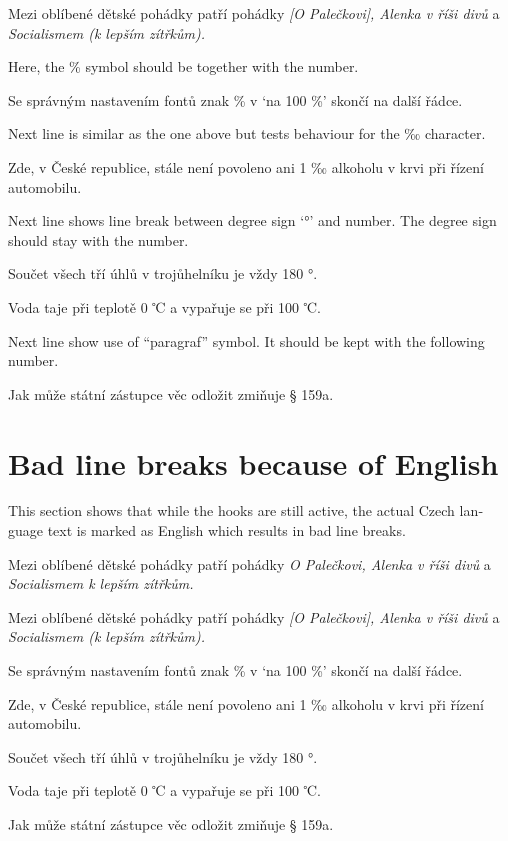 \documentclass{article}
\newcommand{\expl}[1]{\begin{english}\sffamily #1\end{english}}
\begin{document}
Mezi oblíbené dětské pohádky patří pohádky \emph{[O Palečkovi], Alenka v říši
  divů} a \emph{Socialismem (k lepším zítřkům).}

\expl{Here, the \% symbol should be together with the number.}

Se správným nastavením fontů znak \% v `na 100 \%' skončí na další řádce.

\expl{Next line is similar as the one above but tests behaviour for the ‰
  character.}

Zde, v České republice, stále není povoleno ani 1 ‰ alkoholu v krvi při
řízení automobilu.

\expl{Next line shows line break between degree sign `°' and number. The
  degree sign should stay with the number.}

Součet všech tří úhlů v trojůhelníku je vždy 180 °.

Voda taje při teplotě 0 ℃ a vypařuje se při 100 ℃.

\expl{Next line show use of ``paragraf'' symbol. It should be kept with the
  following number.}

Jak může státní zástupce věc odložit zmiňuje § 159a.


\section{Bad line breaks because of English}
\expl{This section shows that while the hooks are still active, the actual
  Czech language text is marked as English which results in bad line breaks.}

\begin{english}
Mezi oblíbené dětské pohádky patří pohádky \emph{O Palečkovi, Alenka v říši
  divů} a \emph{Socialismem k lepším zítřkům.}

Mezi oblíbené dětské pohádky patří pohádky \emph{[O Palečkovi], Alenka v říši
  divů} a \emph{Socialismem (k lepším zítřkům).}

Se správným nastavením fontů znak \% v `na 100 \%' skončí na další řádce.

Zde, v České republice, stále není povoleno ani 1 ‰ alkoholu v krvi při
řízení automobilu.

Součet všech tří úhlů v trojůhelníku je vždy 180 °.

Voda taje při teplotě 0 ℃ a vypařuje se při 100 ℃.

Jak může státní zástupce věc odložit zmiňuje § 159a.

\end{english}
\end{document}
